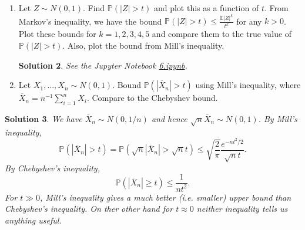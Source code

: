\documentclass[10pt]{article}
\newtheorem*{sol}{Solution}
\renewcommand{\P}{\mathbb{P}}
\newcommand{\E}{\mathbb{E}}
\begin{document}
\begin{enumerate}
\begin{sol}
See the Jupyter Notebook
\href{https://github.com/ajrasmus/some_of_statistics/blob/main/chapter_4/4.ipynb}{4.ipynb}.
\end{sol}

\item[(6)] Let $Z\sim N(0,1)$. Find $\P(|Z|>t)$ and plot this as a function of $t$.
From Markov's inequality, we have the bound $\P(|Z|>t) \leq \frac{\E|Z|^k}{t^k}$
for any $k > 0$. Plot these bounds for $k = 1,2,3,4,5$ and compare them to the
true value of $\P(|Z|>t)$. Also, plot the bound from Mill's inequality.

\begin{sol}
See the Jupyter Notebook
\href{https://github.com/ajrasmus/some_of_statistics/blob/main/chapter_4/6.ipynb}{6.ipynb}.
\end{sol}

\item[(7)] Let $X_1,\ldots,X_n\sim N(0,1)$. Bound $\P(|\overline X_n|>t)$
using Mill's inequality, where $\overline X_n = n^{-1}\sum_{i=1}^n X_i$.
Compare to the Chebyshev bound.
\end{enumerate}

\begin{sol}
We have $\overline X_n \sim N(0,1/n)$ and hence
$\sqrt n \overline X_n \sim N(0,1)$. By Mill's inequality,
\[
\P(|\overline X_n| > t) = \P(\sqrt n |\overline X_n| > \sqrt n t)
\leq \sqrt{\frac{2}{\pi}} \frac{e^{-nt^2/2}}{\sqrt n t}.
\]
By Chebyshev's inequality,
\[
\P(|\overline X_n| \geq t) \leq \frac{1}{nt^2}.
\]
For $t\gg 0$, Mill's inequality gives a much better (i.e. smaller) upper bound
than Chebyshev's inequality. On ther other hand for $t\approx 0$ neither
inequality tells us anything useful.
\end{sol}
\end{document}
